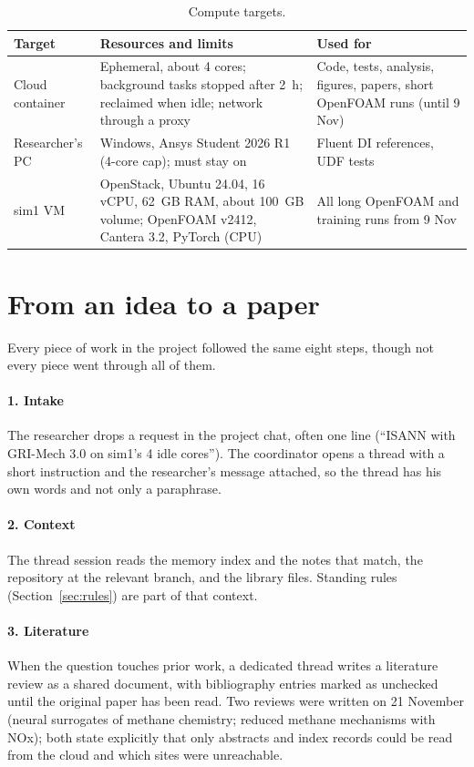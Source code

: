 \documentclass[preprint,review,12pt]{elsarticle}
\begin{document}
\begin{table}[t]
\centering
\caption{Compute targets.}\label{tab:compute}
\small
\begin{tabularx}{\textwidth}{@{}lLL@{}}
\toprule
Target & Resources and limits & Used for \\
\midrule
Cloud container & Ephemeral, about 4 cores; background tasks stopped after 2~h; reclaimed when idle;
  network through a proxy & Code, tests, analysis, figures, papers, short OpenFOAM runs (until 9 Nov) \\
Researcher's PC & Windows, Ansys Student 2026 R1 (4-core cap); must stay on & Fluent DI references, UDF tests \\
sim1 VM & OpenStack, Ubuntu 24.04, 16 vCPU, 62~GB RAM, about 100~GB volume; OpenFOAM v2412, Cantera 3.2, PyTorch (CPU)
  & All long OpenFOAM and training runs from 9 Nov \\
\bottomrule
\end{tabularx}
\end{table}

\section{From an idea to a paper}\label{sec:workflow}

Every piece of work in the project followed the same eight steps, though not every piece went through all of them.

\paragraph{1. Intake} The researcher drops a request in the project chat, often one line (``ISANN with GRI-Mech 3.0 on
sim1's 4 idle cores''). The coordinator opens a thread with a short instruction and the researcher's message attached,
so the thread has his own words and not only a paraphrase.

\paragraph{2. Context} The thread session reads the memory index and the notes that match, the repository at the
relevant branch, and the library files. Standing rules (Section~\ref{sec:rules}) are part of that context.

\paragraph{3. Literature} When the question touches prior work, a dedicated thread writes a literature review as a
shared document, with bibliography entries marked as unchecked until the original paper has been read. Two reviews were
written on 21 November (neural surrogates of methane chemistry; reduced methane mechanisms with NOx); both state
explicitly that only abstracts and index records could be read from the cloud and which sites were unreachable.
\end{document}
